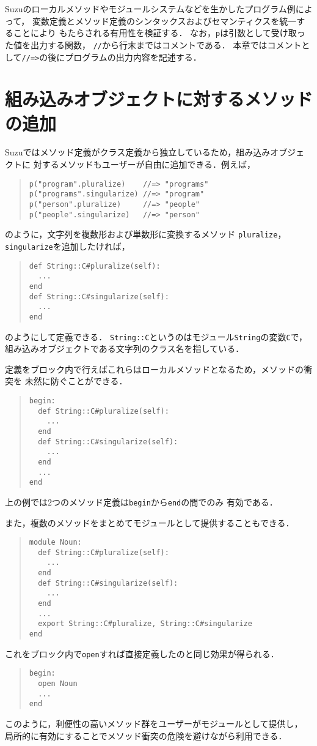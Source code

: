 \documentclass[a4paper,11pt,dvipdfmx]{jreport}
\begin{document}
Suzuのローカルメソッドやモジュールシステムなどを生かしたプログラム例によって，
変数定義とメソッド定義のシンタックスおよびセマンティクスを統一することにより
もたらされる有用性を検証する．
なお，\verb|p|は引数として受け取った値を出力する関数，
\verb|//|から行末まではコメントである．
本章ではコメントとして\verb|//=>|の後にプログラムの出力内容を記述する．

\section{組み込みオブジェクトに対するメソッドの追加}
\label{section:builtin}

Suzuではメソッド定義がクラス定義から独立しているため，組み込みオブジェクトに
対するメソッドもユーザーが自由に追加できる．例えば，
\begin{quote}
\begin{verbatim}
p("program".pluralize)    //=> "programs"
p("programs".singularize) //=> "program"
p("person".pluralize)     //=> "people"
p("people".singularize)   //=> "person"
\end{verbatim}
\end{quote}
のように，文字列を複数形および単数形に変換するメソッド
\verb|pluralize|，\verb|singularize|を追加したければ，
\begin{quote}
\begin{verbatim}
def String::C#pluralize(self):
  ...
end
def String::C#singularize(self):
  ...
end
\end{verbatim}
\end{quote}
のようにして定義できる．
\verb|String::C|というのはモジュール\verb|String|の変数\verb|C|で，
組み込みオブジェクトである文字列のクラス名を指している．

定義をブロック内で行えばこれらはローカルメソッドとなるため，メソッドの衝突を
未然に防ぐことができる．
\begin{quote}
\begin{verbatim}
begin:
  def String::C#pluralize(self):
    ...
  end
  def String::C#singularize(self):
    ...
  end
  ...
end
\end{verbatim}
\end{quote}
上の例では2つのメソッド定義は\verb|begin|から\verb|end|の間でのみ
有効である．

また，複数のメソッドをまとめてモジュールとして提供することもできる．
\begin{quote}
\begin{verbatim}
module Noun:
  def String::C#pluralize(self):
    ...
  end
  def String::C#singularize(self):
    ...
  end
  ...
  export String::C#pluralize, String::C#singularize
end
\end{verbatim}
\end{quote}
これをブロック内で\verb|open|すれば直接定義したのと同じ効果が得られる．
\begin{quote}
\begin{verbatim}
begin:
  open Noun
  ...
end
\end{verbatim}
\end{quote}
このように，利便性の高いメソッド群をユーザーがモジュールとして提供し，
局所的に有効にすることでメソッド衝突の危険を避けながら利用できる．
\end{document}
